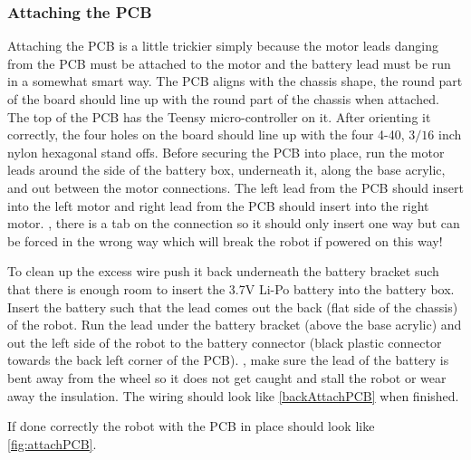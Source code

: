 \subsubsection{Attaching the PCB}
\label{sec:attachPCB}

Attaching the PCB is a little trickier simply because the motor leads danging from the PCB must be attached to the motor and the battery lead must be run in a somewhat smart way. The PCB aligns with the chassis shape, the round part of the board should line up with the round part of the chassis when attached. The top of the PCB has the Teensy micro-controller on it. After orienting it correctly, the four holes on the board should line up with the four 4-40, $3/16$ inch nylon hexagonal stand offs. Before securing the PCB into place, run the motor leads around the side of the battery box, underneath it, along the base acrylic, and out between the motor connections. The left lead from the PCB should insert into the left motor and right lead from the PCB should insert into the right motor. {\color{red}{Note}}, there is a tab on the connection so it should only insert one way but can be forced in the wrong way which will break the robot if powered on this way!

To clean up the excess wire push it back underneath the battery bracket such that there is enough room to insert the 3.7V Li-Po battery into the battery box. Insert the battery such that the lead comes out the back (flat side of the chassis) of the robot. Run the lead under the battery bracket (above the base acrylic) and out the left side of the robot to the battery connector (black plastic connector towards the back left corner of the PCB). {\color{red}{Note}}, make sure the lead of the battery is bent away from the wheel so it does not get caught and stall the robot or wear away the insulation. The wiring should look like \cref{backAttachPCB} when finished.

If done correctly the robot with the PCB in place should look like \cref{fig:attachPCB}.

